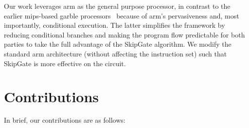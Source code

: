Our work leverages \acrshort{arm} as the general purpose processor, in contrast to the earlier \acrshort{mips}-based garble processors~\cite{songhori2015tinygarble, wang2016secure, songhori2016garbledcpu} because of \acrshort{arm}'s pervasiveness and, most importantly, conditional execution.
The latter simplifies the framework by reducing conditional branches and making the program flow predictable for both parties to take the full advantage of the SkipGate algorithm.
We modify the standard \acrshort{arm} architecture (without affecting the instruction set) such that SkipGate is more effective on the circuit.

\section{Contributions}
In brief, our contributions are as follows:
